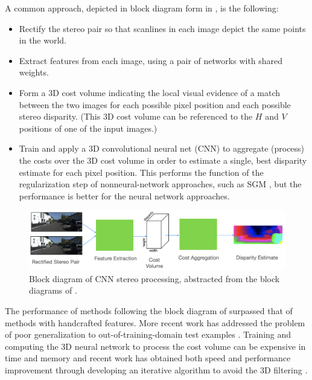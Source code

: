 A common approach, depicted in block diagram form in \fig{\ref{fig:stereoblock}}, is the following:
\begin{itemize}
    \item Rectify the stereo pair so that scanlines in each image depict the same points in the world.
    \item Extract features from each image, using a pair of networks with shared weights.
    \item Form a 3D cost volume indicating the local visual evidence of a match between the two images for each possible pixel position and each possible stereo disparity.  (This 3D cost volume can be referenced to the $H$ and $V$ positions of one of the input images.)
    \item Train and apply a 3D convolutional neural net (CNN) to aggregate (process) the costs over the 3D cost volume in order to estimate a single, best disparity estimate for each pixel position.  This performs the function of the regularization step of nonneural-network approaches, such as SGM \cite{Hirschmuller2007}, but the performance is better for the neural network approaches.
\end{itemize}


\begin{figure}[t]
\centerline{
\includegraphics[width=1\linewidth]{figures/stereo/stereocnn.jpg}
}
\caption{Block diagram of CNN stereo processing, abstracted from the block diagrams of \cite{Chang2018,Zhang2019GANet,Kendall2017}.}
\label{fig:stereoblock}
\end{figure}

The performance of methods following the block diagram of \fig{\ref{fig:stereoblock}} surpassed that of methods with handcrafted features.  More recent work has addressed the problem of poor generalization to out-of-training-domain test examples \cite{zhang2019domaininvariant}.  Training and computing the 3D neural network to process the cost volume can be expensive in time and memory and recent work has obtained both speed and performance improvement through developing an iterative algorithm to avoid the 3D filtering \cite{Lipson2021}.




